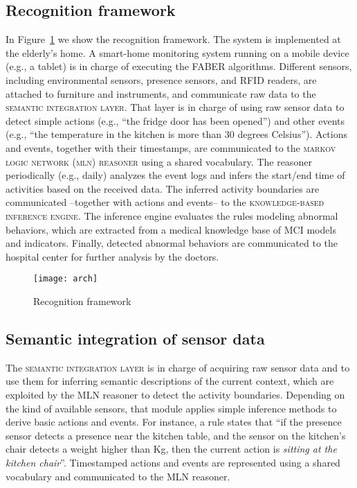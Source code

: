 \documentclass[10pt, conference, compsocconf]{IEEEtran}
\begin{document}
\subsection{Recognition framework}
\label{subsec:framework}
In Figure~\ref{fig:arch} we show the recognition framework. 
The system is implemented at the elderly's 
home. A smart-home monitoring system running on a mobile device
(e.g., a tablet) is in charge of executing the
FABER algorithms. 
Different sensors, including environmental sensors, presence
sensors, and RFID readers, are attached to furniture and 
instruments, and communicate raw data to the 
\textsc{semantic integration layer}. 
That layer is in charge of using raw sensor data to 
detect simple actions (e.g., ``the fridge door has been opened'')
and other events (e.g., ``the temperature in the kitchen
is more than 30 degrees Celsius''). Actions and events, together
with their timestamps, are communicated to the 
\textsc{markov logic network (mln) reasoner} using a shared vocabulary.
The reasoner periodically (e.g., daily) analyzes the event logs and 
infers the start/end time of activities based on the received data.
The inferred activity boundaries are communicated --together with 
actions and events-- to the \textsc{knowledge-based inference engine}. 
The inference engine evaluates the rules modeling abnormal behaviors, 
which are extracted from a medical knowledge base of MCI models and 
indicators.
Finally, detected abnormal behaviors are communicated to the hospital
center for further analysis by the doctors.
\begin{figure}[t!]
  \centering
     \texttt{[image: arch]}
  \caption{Recognition framework}
  \label{fig:arch}
\end{figure}


\subsection{Semantic integration of sensor data}
\label{subsec:semint}
The \textsc{semantic integration layer} is in charge of acquiring
raw sensor data and to use them for inferring semantic
descriptions of the current context, which are exploited by the 
MLN reasoner to detect the activity boundaries.
Depending on the kind of available sensors, that module applies
simple inference methods to derive basic actions and events. 
For instance, a rule states that ``if the presence sensor detects 
a presence near the kitchen table, and the sensor on the kitchen's 
chair detects a weight higher than Kg, then the current action 
is \emph{sitting at the kitchen chair}''.
Timestamped actions and events are represented using a shared vocabulary
and communicated to the MLN reasoner.
\end{document}

